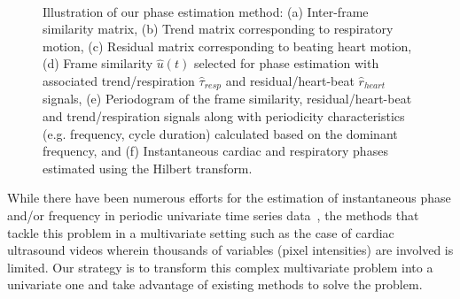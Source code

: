 \documentclass[journal]{IEEEtran}
\newcounter{lfigcounter}
\def\ionbox#1{\makebox[#1]{(\alph{lfigcounter})}\stepcounter{lfigcounter}}
\begin{document}
\begin{figure}[!t]
\ionbox{5.75in}\\
%
\caption{Illustration of our phase estimation method: (a) Inter-frame similarity matrix, (b) Trend matrix corresponding to respiratory motion, (c) Residual matrix corresponding to beating heart motion, (d) Frame similarity $\hat{u}(t)$ selected for phase estimation with associated trend/respiration $\hat{\tau}_{resp}$ and residual/heart-beat $\hat{r}_{heart}$ signals, (e) Periodogram of the frame similarity, residual/heart-beat and trend/respiration signals along with periodicity characteristics (e.g. frequency, cycle duration) calculated based on the dominant frequency, and (f) Instantaneous cardiac and respiratory phases estimated using the Hilbert transform.}
\label{fig:phase_estimation}
\end{figure}
%

While there have been numerous efforts for the estimation of instantaneous phase and/or frequency in periodic univariate time series data~\cite{Boashash1992,Rosenblum2001,Freund2003,Luo2003,Lu2013}, the methods that tackle this problem in a multivariate setting such as the case of cardiac ultrasound videos wherein thousands of variables (pixel intensities) are involved is limited. Our strategy is to transform this complex multivariate problem into a univariate one and take advantage of existing methods to solve the problem. 
%
\end{document}
